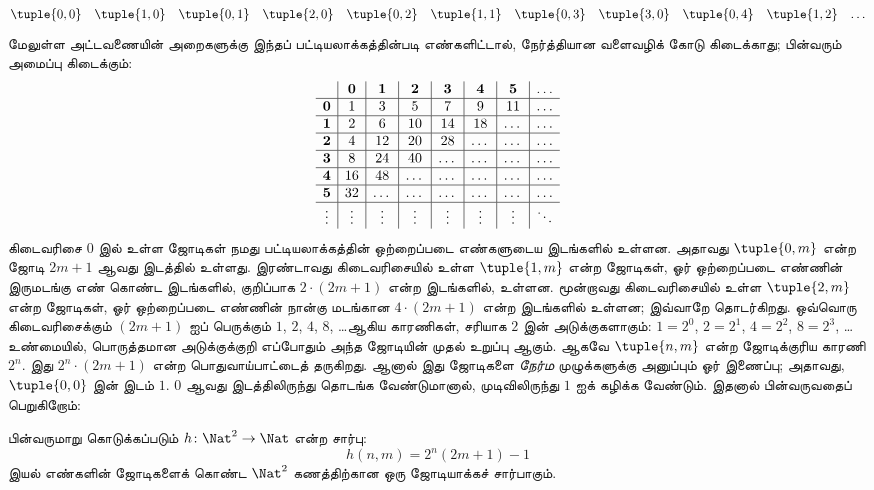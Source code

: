 \documentclass[../../../include/open-logic-section]{subfiles}
\begin{document}
\begin{explain}
\[\begin{array}{@{}cc c c c c c c c c c@{}}
\tuple{0,0} & \tuple{1,0} & \tuple{0,1} & \tuple{2,0}  & \tuple{0,2} &
\tuple{1,1} & \tuple{0,3} & \tuple{3,0}  & \tuple{0,4} &  \tuple{1,2} & \dots \\
\end{array}
\]
மேலுள்ள அட்டவணையின் அறைகளுக்கு இந்தப் பட்டியலாக்கத்தின்படி
எண்களிட்டால், நேர்த்தியான வளைவழிக் கோடு கிடைக்காது;
பின்வரும் அமைப்பு கிடைக்கும்:
\[
\begin{array}{ c | c | c | c | c | c | c | c }
& \mathbf 0 & \mathbf 1 & \mathbf 2 & \mathbf 3 & \mathbf 4 & \mathbf 5 & \dots \\
\hline
\mathbf 0 & 1 & 3 & 5 & 7 & 9 & 11 & \dots \\
\hline
\mathbf 1 & 2 & 6 & 10 & 14 & 18 & \dots & \dots \\
\hline
\mathbf 2 & 4 & 12 & 20 & 28 & \dots & \dots & \dots \\
\hline
\mathbf 3 & 8 & 24 & 40 & \dots & \dots & \dots & \dots \\
\hline
\mathbf 4 & 16 & 48 & \dots & \dots & \dots & \dots & \dots \\
\hline
\mathbf 5 & 32 & \dots & \dots & \dots & \dots & \dots & \dots \\
\hline
\vdots & \vdots & \vdots & \vdots & \vdots & \vdots & \vdots & \ddots\\
\end{array}
\]
கிடைவரிசை $0$ இல் உள்ள ஜோடிகள் நமது பட்டியலாக்கத்தின்
ஒற்றைப்படை எண்களுடைய இடங்களில் உள்ளன.
அதாவது $\tuple{0,m}$ என்ற ஜோடி $2m+1$ ஆவது இடத்தில் உள்ளது.
இரண்டாவது கிடைவரிசையில் உள்ள $\tuple{1,m}$ என்ற ஜோடிகள்,
ஓர் ஒற்றைப்படை எண்ணின் இருமடங்கு எண் கொண்ட இடங்களில்,
குறிப்பாக $2 \cdot (2m+1)$ என்ற இடங்களில், உள்ளன.
மூன்றாவது கிடைவரிசையில் உள்ள $\tuple{2,m}$ என்ற ஜோடிகள்,
ஓர் ஒற்றைப்படை எண்ணின் நான்கு மடங்கான
$4 \cdot (2m+1)$ என்ற இடங்களில் உள்ளன; இவ்வாறே தொடர்கிறது.
ஒவ்வொரு கிடைவரிசைக்கும் $(2m+1)$ ஐப் பெருக்கும்
$1$, $2$, $4$, $8$, \dots ஆகிய காரணிகள்,
சரியாக $2$ இன் அடுக்குகளாகும்:
$1= 2^0$, $2 = 2^1$, $4 = 2^2$, $8 = 2^3$, \dots\@
உண்மையில், பொருத்தமான அடுக்குக்குறி எப்போதும் அந்த ஜோடியின்
முதல் உறுப்பு ஆகும்.
ஆகவே $\tuple{n,m}$ என்ற ஜோடிக்குரிய காரணி $2^n$.
இது $2^n \cdot (2m+1)$ என்ற பொதுவாய்பாட்டைத் தருகிறது.
ஆனால் இது ஜோடிகளை \emph{நேர்ம} முழுக்களுக்கு அனுப்பும் ஓர் இணைப்பு;
அதாவது, $\tuple{0,0}$ இன் இடம் $1$.
$0$ ஆவது இடத்திலிருந்து தொடங்க வேண்டுமானால்,
முடிவிலிருந்து $1$ ஐக் கழிக்க வேண்டும்.
இதனால் பின்வருவதைப் பெறுகிறோம்:
\end{explain}

\begin{ex}
பின்வருமாறு கொடுக்கப்படும் $h\colon \Nat^2 \to \Nat$ என்ற சார்பு:
\[
h(n,m) = 2^n (2m+1) - 1
\]
இயல் எண்களின் ஜோடிகளைக் கொண்ட $\Nat^2$ கணத்திற்கான
ஒரு ஜோடியாக்கச் சார்பாகும்.
\end{ex}
\end{document}
